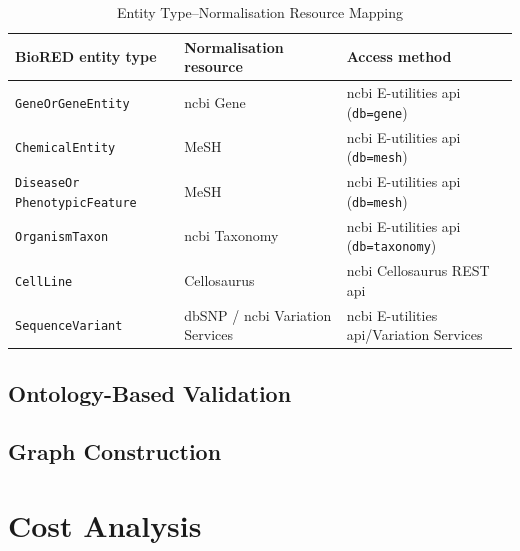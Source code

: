 \noindent \pref

\begin{table}[H]
    \centering
    \caption{Entity Type--Normalisation Resource Mapping}
    \label{tab:entity_type_normalisation_resource_mapping}
    \begin{tabularx}{\textwidth}{X X X}
        \toprule
        BioRED entity type & Normalisation resource & Access method \\
        \midrule
        \texttt{GeneOrGeneEntity} & \gls{ncbi} Gene & \gls{ncbi} E-utilities \gls{api} (\texttt{db=gene}) \\
        \texttt{ChemicalEntity} & MeSH & \gls{ncbi} E-utilities \gls{api} (\texttt{db=mesh}) \\
        \texttt{DiseaseOr} \texttt{PhenotypicFeature} & MeSH & \gls{ncbi} E-utilities \gls{api} (\texttt{db=mesh}) \\
        \texttt{OrganismTaxon} & \gls{ncbi} Taxonomy & \gls{ncbi} E-utilities \gls{api} (\texttt{db=taxonomy}) \\
        \texttt{CellLine} & Cellosaurus & \gls{ncbi} Cellosaurus REST \gls{api} \\
        \texttt{SequenceVariant} & dbSNP / \gls{ncbi} Variation Services & \gls{ncbi} E-utilities \gls{api}/Variation Services \\
        \bottomrule
    \end{tabularx}
\end{table}


\subsection{Ontology-Based Validation}
\label{subsec:meth:ontology_based_validation}

\subsection{Graph Construction}
\label{subsec:meth:graph_construction}

\section{Cost Analysis}
\label{sec:meth:cost_analysis}
